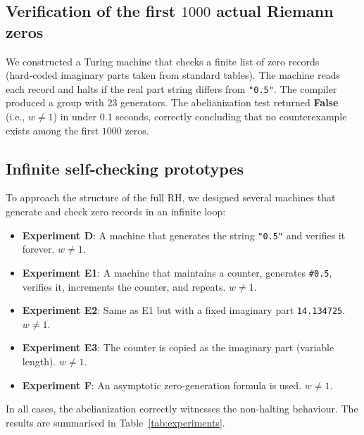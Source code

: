\documentclass[11pt,a4paper]{article}
\begin{document}
\subsection{Verification of the first $1000$ actual Riemann zeros}
We constructed a Turing machine that checks a finite list of zero records (hard‑coded imaginary parts taken from standard tables). The machine reads each record and halts if the real part string differs from \texttt{"0.5"}. The compiler produced a group with 23 generators. The abelianization test returned \textbf{False} (i.e., \(w \neq 1\)) in under $0.1$ seconds, correctly concluding that no counterexample exists among the first $1000$ zeros.

\subsection{Infinite self‑checking prototypes}
To approach the structure of the full RH, we designed several machines that generate and check zero records in an infinite loop:
\begin{itemize}[leftmargin=*]
    \item \textbf{Experiment D}: A machine that generates the string \texttt{"0.5"} and verifies it forever. \(w \neq 1\).
    \item \textbf{Experiment E1}: A machine that maintains a counter, generates \texttt{\#0.5}, verifies it, increments the counter, and repeats. \(w \neq 1\).
    \item \textbf{Experiment E2}: Same as E1 but with a fixed imaginary part \texttt{14.134725}. \(w \neq 1\).
    \item \textbf{Experiment E3}: The counter is copied as the imaginary part (variable length). \(w \neq 1\).
    \item \textbf{Experiment F}: An asymptotic zero‑generation formula is used. \(w \neq 1\).
\end{itemize}
In all cases, the abelianization correctly witnesses the non‑halting behaviour. The results are summarised in Table~\ref{tab:experiments}.
\end{document}
